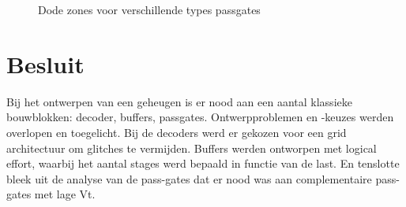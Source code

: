 \begin{figure}[!ht]
\caption{Dode zones voor verschillende types passgates}
\label{fig:passgate3}
\end{figure}



\section{Besluit}
Bij het ontwerpen van een geheugen is er nood aan een aantal klassieke bouwblokken: decoder, buffers, passgates. Ontwerpproblemen en -keuzes werden overlopen en toegelicht. Bij de decoders werd er gekozen voor een grid architectuur om glitches te vermijden. Buffers werden ontworpen met logical effort, waarbij het aantal stages werd bepaald in functie van de last. En tenslotte bleek uit de analyse van de pass-gates dat er nood was aan complementaire pass-gates met lage Vt.
